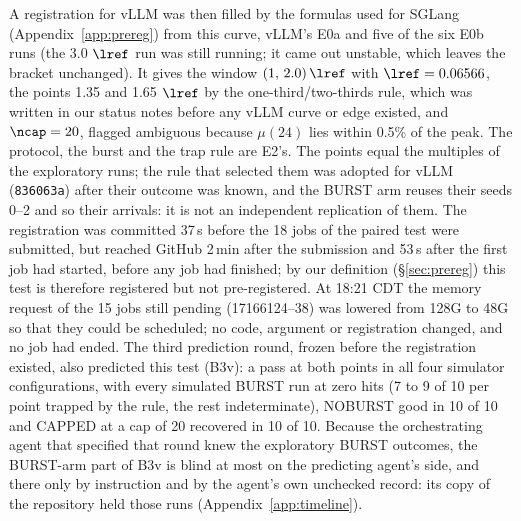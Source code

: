 A registration for vLLM was then filled by the formulas used for SGLang (Appendix~\ref{app:prereg}) from this curve, vLLM's E0a and five of the six E0b runs (the 3.0 $\lref$ run was still running; it came out unstable, which leaves the bracket unchanged). It gives the window $(1,\,2.0)\,\lref$ with $\lref=0.06566$\sps, the points 1.35 and 1.65 $\lref$ by the one-third/two-thirds rule, which was written in our status notes before any vLLM curve or edge existed, and $\ncap=20$, flagged ambiguous because $\mu(24)$ lies within 0.5\% of the peak. The protocol, the burst and the trap rule are E2's. The points equal the multiples of the exploratory runs; the rule that selected them was adopted for vLLM (\texttt{836063a}) after their outcome was known, and the BURST arm reuses their seeds 0--2 and so their arrivals: it is not an independent replication of them. The registration was committed 37\,s before the 18 jobs of the paired test were submitted, but reached GitHub 2\,min after the submission and 53\,s after the first job had started, before any job had finished; by our definition (\S\ref{sec:prereg}) this test is therefore registered but not pre-registered. At 18:21 CDT the memory request of the 15 jobs still pending (17166124--38) was lowered from 128G to 48G so that they could be scheduled; no code, argument or registration changed, and no job had ended. The third prediction round, frozen before the registration existed, also predicted this test (B3v): a pass at both points in all four simulator configurations, with every simulated BURST run at zero hits (7 to 9 of 10 per point trapped by the rule, the rest indeterminate), NOBURST good in 10 of 10 and CAPPED at a cap of 20 recovered in 10 of 10. Because the orchestrating agent that specified that round knew the exploratory BURST outcomes, the BURST-arm part of B3v is blind at most on the predicting agent's side, and there only by instruction and by the agent's own unchecked record: its copy of the repository held those runs (Appendix~\ref{app:timeline}).


